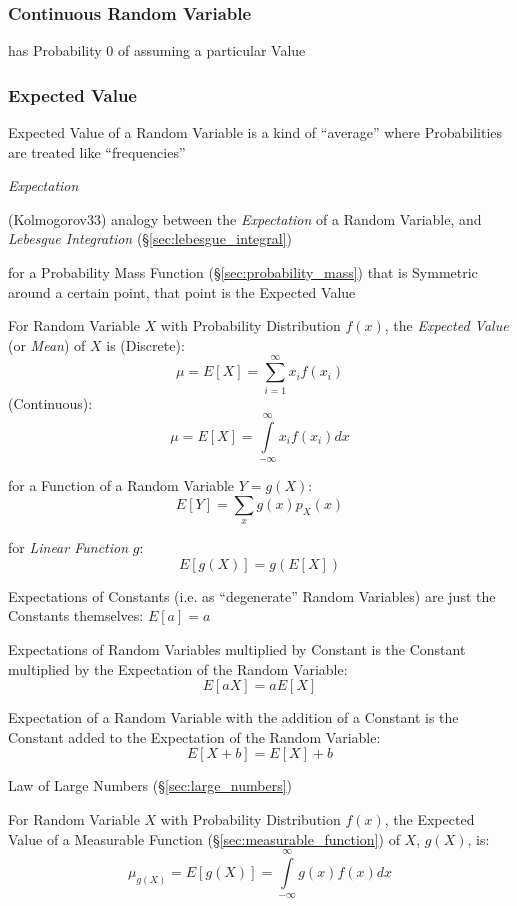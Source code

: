 \subsubsection{Continuous Random Variable}
\label{sec:continuous_random_variable}

has Probability $0$ of assuming a particular Value



\subsubsection{Expected Value}\label{sec:expected_value}

Expected Value of a Random Variable is a kind of ``average'' where
Probabilities are treated like ``frequencies''

\emph{Expectation}

(Kolmogorov33) analogy between the \emph{Expectation} of a Random Variable, and
\emph{Lebesgue Integration} (\S\ref{sec:lebesgue_integral})

for a Probability Mass Function (\S\ref{sec:probability_mass}) that is
Symmetric around a certain point, that point is the Expected Value

For Random Variable $X$ with Probability Distribution $f(x)$, the
\emph{Expected Value} (or \emph{Mean}) of $X$ is (Discrete):
\[
  \mu = E[X] = \sum_{i=1}^\infty x_i f(x_i)
\]
(Continuous):
\[
  \mu = E[X] = \int\limits_{-\infty}^{\infty} x_i f(x_i) dx
\]

for a Function of a Random Variable $Y = g(X)$:
\[
  E[Y] = \sum_x g(x)p_X(x)
\]

for \emph{Linear Function} $g$:
\[
  E[g(X)] = g(E[X])
\]

Expectations of Constants (i.e. as ``degenerate'' Random Variables) are just
the Constants themselves: $E[a] = a$

Expectations of Random Variables multiplied by Constant is the Constant
multiplied by the Expectation of the Random Variable:
\[
  E[aX] = aE[X]
\]

Expectation of a Random Variable with the addition of a Constant is the
Constant added to the Expectation of the Random Variable:
\[
  E[X + b] = E[X] + b
\]

Law of Large Numbers (\S\ref{sec:large_numbers})

For Random Variable $X$ with Probability Distribution $f(x)$, the
Expected Value of a Measurable Function
(\S\ref{sec:measurable_function}) of $X$, $g(X)$, is:
\[
  \mu_{g(X)} = E[g(X)] = \int\limits_{-\infty}^{\infty} g(x) f(x) dx
\]

